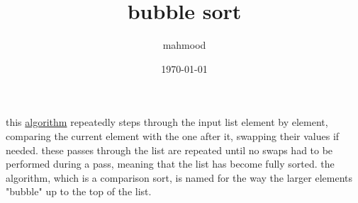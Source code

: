 \documentclass[a4paper,12pt]{article}
\author{mahmood}
\date{\today}
\title{bubble sort}
\begin{document}
\maketitle
this \href{20220706211958-algorithm.org}{algorithm} repeatedly steps through the input list element by element, comparing the current element with the one after it, swapping their values if needed. these passes through the list are repeated until no swaps had to be performed during a pass, meaning that the list has become fully sorted. the algorithm, which is a comparison sort, is named for the way the larger elements "bubble" up to the top of the list.\\

\\
\end{document}
